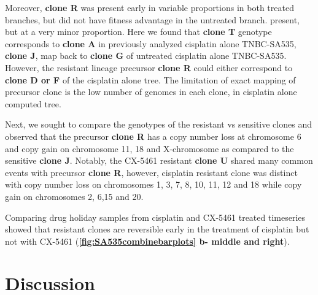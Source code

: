 Moreover, \textbf{clone R} was present early in variable proportions in both treated branches, but did not have fitness advantage in the untreated branch. present, but at a very minor proportion. Here we found that \textbf{clone T} genotype corresponds to \textbf{clone A} in previously analyzed cisplatin alone TNBC-SA535, \textbf{clone J}, map back to \textbf{clone G} of untreated cisplatin alone TNBC-SA535. However, the resistant lineage precursor \textbf{clone R} could either correspond to \textbf{clone D or F} of the cisplatin alone tree. The limitation of exact mapping of precursor clone is the low number of genomes in each clone, in cisplatin alone computed tree.



Next, we sought to compare the genotypes of the resistant vs sensitive clones and observed that the precursor \textbf{clone R} has a copy number loss at chromosome 6 and copy gain on chromosome 11, 18 and X-chromosome as compared to the sensitive \textbf{clone J}. Notably, the CX-5461 resistant \textbf{clone U} shared many common events with precursor \textbf{clone R}, however, cisplatin resistant clone was distinct with copy number loss on chromosomes 1, 3, 7, 8, 10, 11, 12 and 18 while copy gain on chromosomes 2, 6,15 and 20.


Comparing drug holiday samples from cisplatin and CX-5461 treated timeseries showed that resistant clones are reversible early in the treatment of cisplatin but not with CX-5461 (\textbf{\autoref{fig:SA535combinebarplots} b- middle and right}).



\section{Discussion}


